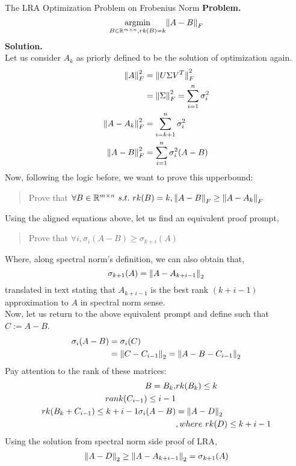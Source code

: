 \begin{ln-explain}{The LRA Optimization Problem on Frobenius Norm}{}
    \textbf{Problem.}
    \[
        \underset{B \in \R^{m \times n}, rk(B) = k}{\text{argmin}} \pnorm{A - B}{F}
    \]
    \tcblower
    \textbf{Solution.} \\
    Let us consider $A_k$ as priorly defined to be the solution of optimization again.
    \begin{align*}
        \pnorm[2]{A}{F} &= \pnorm[2]{U \Sigma V^T}{F} \\
        &= \pnorm[2]{\Sigma}{F} = \sum_{i = 1}^n \sigma_i^2 \\
        \pnorm[2]{A - A_k}{F} &= \sum_{i = k + 1}^n \sigma_i^2 \\
        \pnorm[2]{A - B}{F} &= \sum_{i = 1}^n \sigma_i^2 (A - B)
    \end{align*}
    Now, following the logic before, we want to prove this upperbound:
    \begin{quote}
        Prove that $\forall B \in \R^{m \times n}\ s.t.\ rk(B) = k, \pnorm{A - B}{F} \geq \pnorm{A - A_k}{F}$
    \end{quote}
    Using the aligned equations above, let us find an equivalent proof prompt,
    \begin{quote}
        Prove that $\forall i, \sigma_i (A - B) \geq \sigma_{k + i}(A)$
    \end{quote}
    Where, along spectral norm's definition, we can also obtain that,
    \[
        \sigma_{k + 1}(A) = \pnorm{A - A_{k + i - 1}}{2}
    \]
    translated in text stating that $A_{k + i - 1}$ is the best rank $(k + i - 1)$ approximation to $A$ in spectral norm sense. \\
    Now, let us return to the above equivalent prompt and define such that $C := A - B$.
    \begin{align*}
        \sigma_i (A - B)
        &= \sigma_i (C) \\
        &= \pnorm{C - C_{i - 1}}{2} = \pnorm{A - B - C_{i - 1}}{2}
    \end{align*}
    Pay attention to the rank of these matrices:
    \begin{align*}
        B = B_k, &rk(B_k) \leq k \\
        rank(C_{i - 1}) \leq i - 1 \\
        rk(B_k + C_{i - 1}) \leq k + i - 1
        \sigma_i (A - B) &= \pnorm{A - D}{2}\\
        &, where\ rk(D) \leq k + i - 1
    \end{align*}
    Using the solution from spectral norm side proof of LRA,
    \begin{align*}
        \pnorm{A - D}{2} \geq \pnorm{A - A_{k + i - 1}}{2} = \sigma_{k + 1} (A)
    \end{align*}
\end{ln-explain}
